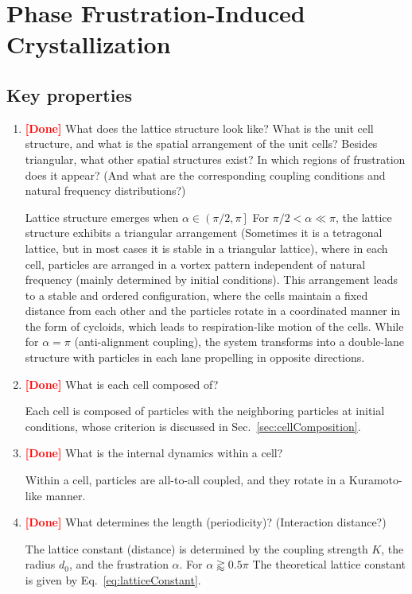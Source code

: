 \documentclass{article}
\begin{document}
\newpage
\section{Phase Frustration-Induced Crystallization}

\subsection{Key properties}

\begin{enumerate}
    \item \textbf{\textcolor{red}{[Done]}} What does the lattice structure look like? What is the unit cell structure, and what is the spatial arrangement of the unit cells? Besides triangular, what other spatial structures exist? In which regions of frustration does it appear? (And what are the corresponding coupling conditions and natural frequency distributions?)
    
        Lattice structure emerges when $\alpha\in\left(\pi/2, \pi\right]$
        For $\pi/2<\alpha\ll\pi$, the lattice structure exhibits a triangular arrangement (Sometimes it is a tetragonal lattice, but in most cases it is stable in a triangular lattice), where in each cell, particles are arranged in a vortex pattern independent of natural frequency (mainly determined by initial conditions). This arrangement leads to a stable and ordered configuration, where the cells maintain a fixed distance from each other and the particles rotate in a coordinated manner in the form of cycloids, which leads to respiration-like motion of the cells.
        While for $\alpha=\pi$ (anti-alignment coupling), the system transforms into a double-lane structure with particles in each lane propelling in opposite directions. 
    \item \textbf{\textcolor{red}{[Done]}} What is each cell composed of?
    
        Each cell is composed of particles with the neighboring particles at initial conditions, whose criterion is discussed in Sec.~\ref{sec:cellComposition}. 
    \item \textbf{\textcolor{red}{[Done]}} What is the internal dynamics within a cell?
    
        Within a cell, particles are all-to-all coupled, and they rotate in a Kuramoto-like manner.
    \item \textbf{\textcolor{red}{[Done]}} What determines the length (periodicity)? (Interaction distance?)

        The lattice constant (distance) is determined by the coupling strength $K$, the radius $d_0$, and the frustration $\alpha$. For $\alpha\gtrapprox0.5\pi$ The theoretical lattice constant is given by Eq.~\eqref{eq:latticeConstant}. 
\end{enumerate}
\end{document}
